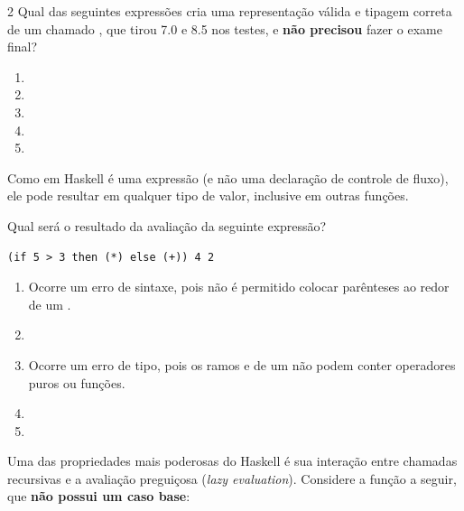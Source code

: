 \documentclass[a4paper,10pt,brazil]{article}
\begin{document}
\begin{multicols}{2}
Qual das seguintes expressões cria uma representação válida e tipagem correta de um  chamado , que tirou 7.0 e 8.5 nos testes, e \textbf{não precisou} fazer o exame final?

\begin{enumerate}
  \item {}

  \item {}

  \item {}

  \item {}

  \item {}


\end{enumerate}

Como  em Haskell é uma expressão (e não uma declaração de controle de fluxo), ele pode resultar em qualquer tipo de valor, inclusive em outras funções. 

Qual será o resultado da avaliação da seguinte expressão?
\begin{verbatim}
(if 5 > 3 then (*) else (+)) 4 2
\end{verbatim}

\begin{enumerate}
  \item Ocorre um erro de sintaxe, pois não é permitido colocar parênteses ao redor de um .

  \item {}

  \item Ocorre um erro de tipo, pois os ramos  e  de um  não podem conter operadores puros ou funções.

  \item {}

  \item {}


\end{enumerate}

Uma das propriedades mais poderosas do Haskell é sua interação entre chamadas recursivas e a avaliação preguiçosa (\emph{lazy evaluation}). Considere a função a seguir, que \textbf{não possui um caso base}:


\end{multicols}
\end{document}
